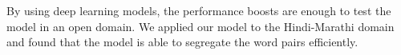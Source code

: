 \documentclass[11pt,letterpaper]{article}
\begin{document}
By using deep learning models, the performance boosts are enough to test the model in an open domain. We applied our model to the Hindi-Marathi domain and found that the model is able to segregate the word pairs efficiently. 



\end{document}
